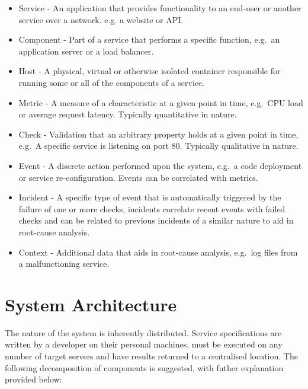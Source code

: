 \documentclass{cshonours}
\begin{document}
\begin{itemize}
  \item Service - An application that provides functionality to an end-user or another service over a network. e.g. a website or API.
  \item Component - Part of a service that performs a specific function, e.g.\ an application server or a load balancer.
  \item Host - A physical, virtual or otherwise isolated container responsible for running some or all of the components of a service.
  \item Metric - A measure of a characteristic at a given point in time, e.g.\ CPU load or average request latency. Typically quantitative in nature.
  \item Check - Validation that an arbitrary property holds at a given point in time, e.g.\ A specific service is listening on port 80. Typically qualitative in nature.
  \item Event - A discrete action performed upon the system, e.g.\ a code deployment or service re-configuration. Events can be correlated with metrics.
  \item Incident - A specific type of event that is automatically triggered by the failure of one or more checks, incidents correlate recent events with failed checks and can be related to previous incidents of a similar nature to aid in root-cause analysis.
  \item Context - Additional data that aids in root-cause analysis, e.g.\ log files from a malfunctioning service.
\end{itemize}

\pagebreak
\section{System Architecture}

\label{section:architecture}

The nature of the system is inherently distributed. Service specifications are written by a developer on their personal machines, must be executed on any number of target servers and have results returned to a centralised location. The following decomposition of components is suggested, with futher explanation provided below:
\end{document}
